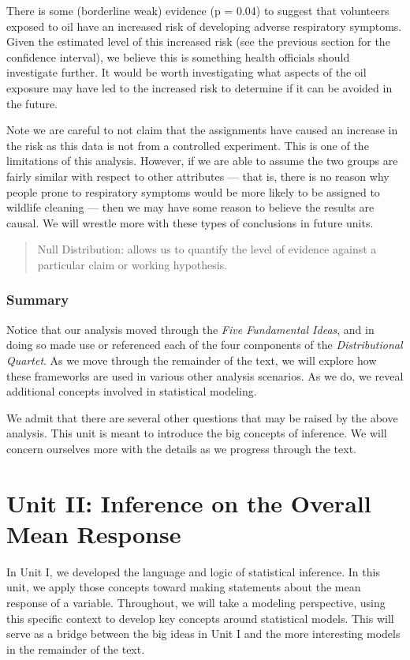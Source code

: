 \documentclass[
  letterpaper,
  DIV=11,
  numbers=noendperiod]{scrreprt}
\theoremstyle{definition}
\theoremstyle{definition}
\theoremstyle{plain}
\theoremstyle{remark}
\begin{document}
There is some (borderline weak) evidence (p = 0.04) to suggest that
volunteers exposed to oil have an increased risk of developing adverse
respiratory symptoms. Given the estimated level of this increased risk
(see the previous section for the confidence interval), we believe this
is something health officials should investigate further. It would be
worth investigating what aspects of the oil exposure may have led to the
increased risk to determine if it can be avoided in the future.

Note we are careful to not claim that the assignments have caused an
increase in the risk as this data is not from a controlled experiment.
This is one of the limitations of this analysis. However, if we are able
to assume the two groups are fairly similar with respect to other
attributes --- that is, there is no reason why people prone to
respiratory symptoms would be more likely to be assigned to wildlife
cleaning --- then we may have some reason to believe the results are
causal. We will wrestle more with these types of conclusions in future
units.

\begin{quote}
Null Distribution: allows us to quantify the level of evidence against a
particular claim or working hypothesis.
\end{quote}

\section{Summary}\label{summary}

Notice that our analysis moved through the \emph{Five Fundamental
Ideas}, and in doing so made use or referenced each of the four
components of the \emph{Distributional Quartet}. As we move through the
remainder of the text, we will explore how these frameworks are used in
various other analysis scenarios. As we do, we reveal additional
concepts involved in statistical modeling.

We admit that there are several other questions that may be raised by
the above analysis. This unit is meant to introduce the big concepts of
inference. We will concern ourselves more with the details as we
progress through the text.

\part{Unit II: Inference on the Overall Mean Response}

In Unit I, we developed the language and logic of statistical inference.
In this unit, we apply those concepts toward making statements about the
mean response of a variable. Throughout, we will take a modeling
perspective, using this specific context to develop key concepts around
statistical models. This will serve as a bridge between the big ideas in
Unit I and the more interesting models in the remainder of the text.
\end{document}
